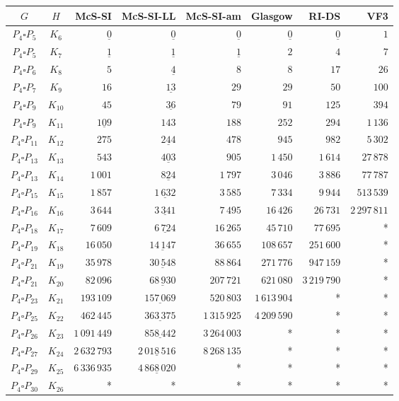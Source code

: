 
\begin{tabular}{ccrrrrrr}
    \toprule
    {$G$} & {$H$} & {McS-SI} & {McS-SI-LL} & {McS-SI-am} & Glasgow & RI-DS & VF3\\ 
    \midrule

$P_4\square P_{5}$ & $K_{6}$ & $\underline{0}$ & $\underline{0}$ & $\underline{0}$ & $\underline{0}$ & $\underline{0}$ & $1$\\
$P_4\square P_{5}$ & $K_{7}$ & $\underline{1}$ & $\underline{1}$ & $\underline{1}$ & $2$ & $4$ & $7$\\
$P_4\square P_{6}$ & $K_{8}$ & $5$ & $\underline{4}$ & $8$ & $8$ & $17$ & $26$\\
$P_4\square P_{7}$ & $K_{9}$ & $16$ & $\underline{13}$ & $29$ & $29$ & $50$ & $100$\\
$P_4\square P_{9}$ & $K_{10}$ & $45$ & $\underline{36}$ & $79$ & $91$ & $125$ & $394$\\
$P_4\square P_{9}$ & $K_{11}$ & $\underline{109}$ & $143$ & $188$ & $252$ & $294$ & $1\,136$\\
$P_4\square P_{11}$ & $K_{12}$ & $275$ & $\underline{244}$ & $478$ & $945$ & $982$ & $5\,302$\\
$P_4\square P_{13}$ & $K_{13}$ & $543$ & $\underline{403}$ & $905$ & $1\,450$ & $1\,614$ & $27\,878$\\
$P_4\square P_{13}$ & $K_{14}$ & $1\,001$ & $\underline{824}$ & $1\,797$ & $3\,046$ & $3\,886$ & $77\,787$\\
$P_4\square P_{15}$ & $K_{15}$ & $1\,857$ & $\underline{1\,632}$ & $3\,585$ & $7\,334$ & $9\,944$ & $513\,539$\\
$P_4\square P_{16}$ & $K_{16}$ & $3\,644$ & $\underline{3\,341}$ & $7\,495$ & $16\,426$ & $26\,731$ & $2\,297\,811$\\
$P_4\square P_{18}$ & $K_{17}$ & $7\,609$ & $\underline{6\,724}$ & $16\,265$ & $45\,710$ & $77\,695$ & *\\
$P_4\square P_{19}$ & $K_{18}$ & $16\,050$ & $\underline{14\,147}$ & $36\,655$ & $108\,657$ & $251\,600$ & *\\
$P_4\square P_{21}$ & $K_{19}$ & $35\,978$ & $\underline{30\,548}$ & $88\,864$ & $271\,776$ & $947\,159$ & *\\
$P_4\square P_{21}$ & $K_{20}$ & $82\,096$ & $\underline{68\,930}$ & $207\,721$ & $621\,080$ & $3\,219\,790$ & *\\
$P_4\square P_{23}$ & $K_{21}$ & $193\,109$ & $\underline{157\,069}$ & $520\,803$ & $1\,613\,904$ & * & *\\
$P_4\square P_{25}$ & $K_{22}$ & $462\,445$ & $\underline{363\,375}$ & $1\,315\,925$ & $4\,209\,590$ & * & *\\
$P_4\square P_{26}$ & $K_{23}$ & $1\,091\,449$ & $\underline{858\,442}$ & $3\,264\,003$ & * & * & *\\
$P_4\square P_{27}$ & $K_{24}$ & $2\,632\,793$ & $\underline{2\,018\,516}$ & $8\,268\,135$ & * & * & *\\
$P_4\square P_{29}$ & $K_{25}$ & $6\,336\,935$ & $\underline{4\,868\,020}$ & * & * & * & *\\
$P_4\square P_{30}$ & $K_{26}$ & * & * & * & * & * & *\\

    \bottomrule
\end{tabular}

